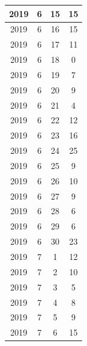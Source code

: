 \begin{longtable} {|c|c|c|c|}
\hline
2019         & 6            & 15           & 15                        \\ 
\hline
2019         & 6            & 16           & 15                        \\ 
\hline
2019         & 6            & 17           & 11                        \\ 
\hline
2019         & 6            & 18           & 0                         \\ 
\hline
2019         & 6            & 19           & 7                         \\ 
\hline
2019         & 6            & 20           & 9                         \\ 
\hline
2019         & 6            & 21           & 4                         \\ 
\hline
2019         & 6            & 22           & 12                        \\ 
\hline
2019         & 6            & 23           & 16                        \\ 
\hline
2019         & 6            & 24           & 25                        \\ 
\hline
2019         & 6            & 25           & 9                         \\ 
\hline
2019         & 6            & 26           & 10                        \\ 
\hline
2019         & 6            & 27           & 9                         \\ 
\hline
2019         & 6            & 28           & 6                         \\ 
\hline
2019         & 6            & 29           & 6                         \\ 
\hline
2019         & 6            & 30           & 23                        \\ 
\hline
2019         & 7            & 1            & 12                        \\ 
\hline
2019         & 7            & 2            & 10                        \\ 
\hline
2019         & 7            & 3            & 5                         \\ 
\hline
2019         & 7            & 4            & 8                         \\ 
\hline
2019         & 7            & 5            & 9                         \\ 
\hline
2019         & 7            & 6            & 15                        \\ 

\end{longtable}

